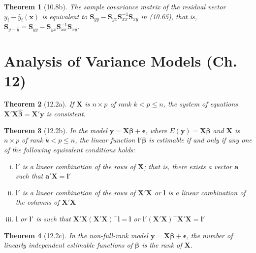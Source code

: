 \documentclass{article}
\newtheorem{theorem}{Theorem}[section]
\begin{document}
\begin{theorem}[10.8b]
The sample covariance matrix of the residual vector $y_i - \hat{y}_i(\mathbf{x})$ is equivalent to $\mathbf{S}_{yy} - \mathbf{S}_{yx}\mathbf{S}_{xx}^{-1}\mathbf{S}_{xy}$ in (10.65), that is, $\mathbf{S}_{y-\hat{y}} = \mathbf{S}_{yy} - \mathbf{S}_{yx}\mathbf{S}_{xx}^{-1}\mathbf{S}_{xy}$.
\end{theorem}

\section{Analysis of Variance Models (Ch. 12)}

\begin{theorem}[12.2a]
If $\mathbf{X}$ is $n \times p$ of rank $k < p \leq n$, the system of equations $\mathbf{X}'\mathbf{X}\hat{\boldsymbol{\beta}} = \mathbf{X}'\mathbf{y}$ is consistent.
\end{theorem}

\begin{theorem}[12.2b]
In the model $\mathbf{y} = \mathbf{X}\boldsymbol{\beta} + \boldsymbol{\epsilon}$, where $E(\mathbf{y}) = \mathbf{X}\boldsymbol{\beta}$ and $\mathbf{X}$ is $n \times p$ of rank $k < p \leq n$, the linear function $\mathbf{l}'\boldsymbol{\beta}$ is estimable if and only if any one of the following equivalent conditions holds:

\begin{enumerate}[(i)]
\item $\mathbf{l}'$ is a linear combination of the rows of $\mathbf{X}$; that is, there exists a vector $\mathbf{a}$ such that $\mathbf{a}'\mathbf{X} = \mathbf{l}'$
\item $\mathbf{l}'$ is a linear combination of the rows of $\mathbf{X}'\mathbf{X}$ or $\mathbf{l}$ is a linear combination of the columns of $\mathbf{X}'\mathbf{X}$
\item $\mathbf{l}$ or $\mathbf{l}'$ is such that $\mathbf{X}'\mathbf{X}(\mathbf{X}'\mathbf{X})^{-}\mathbf{l} = \mathbf{l}$ or $\mathbf{l}'(\mathbf{X}'\mathbf{X})^{-}\mathbf{X}'\mathbf{X} = \mathbf{l}'$
\end{enumerate}
\end{theorem}

\begin{theorem}[12.2c]
In the non-full-rank model $\mathbf{y} = \mathbf{X}\boldsymbol{\beta} + \boldsymbol{\epsilon}$, the number of linearly independent estimable functions of $\boldsymbol{\beta}$ is the rank of $\mathbf{X}$.
\end{theorem}
\end{document}

